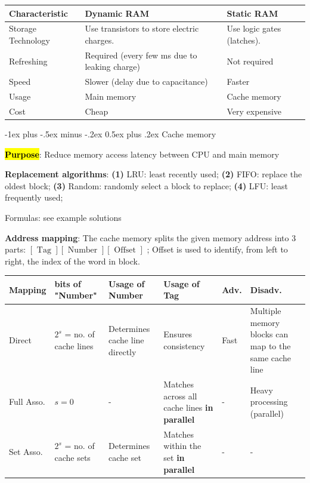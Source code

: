 \documentclass[a4paper]{article}
\makeatletter
\renewcommand{\section}{\@startsection{section}{1}{0mm}%
                                {-1ex plus -.5ex minus -.2ex}%
                                {0.5ex plus .2ex}%
                                {\normalfont\normalsize\bfseries}}
\makeatother
\begin{document}
\begin{multicols*}{2}
  \begin{tabular}{|l|l|l|}
    \hline
    \textbf{Characteristic} & \textbf{Dynamic RAM}                          & \textbf{Static RAM}        \\ \hline
    Storage Technology      & Use transistors to store electric charges.    & Use logic gates (latches). \\ \hline
    Refreshing              & Required (every few ms due to leaking charge) & Not required               \\ \hline
    Speed                   & Slower (delay due to capacitance)             & Faster                     \\ \hline
    Usage                   & Main memory                                   & Cache memory               \\ \hline
    Cost                    & Cheap                                         & Very expensive             \\ \hline
  \end{tabular}



  \section{Cache memory}

  \hl{\textbf{Purpose}}: Reduce memory access latency between CPU and main memory

  \textbf{Replacement algorithms}: \textbf{(1)} LRU: least recently used; \textbf{(2)} FIFO: replace the oldest block; \textbf{(3)} Random: randomly select a block to replace; \textbf{(4)} LFU: least frequently used;

  Formulas: see example solutions

  \textbf{Address mapping}: The cache memory splits the given memory address into 3 parts: $[\text{   Tag    }][\text{   Number    }][\text{   Offset    }]$
  ; Offset is used to identify, from left to right, the index of the word in block.

  \begin{tabular}{|p{1cm}|p{1cm}|p{2cm}|p{2cm}|p{1cm}|p{2cm}|}
    \hline
    \textbf{Mapping} & \textbf{bits of "Number"}  & \textbf{Usage of Number}       & \textbf{Usage of Tag}                               & \textbf{Adv.} & \textbf{Disadv.}                                      \\ \hline
    Direct           & $2^s$ = no. of cache lines & Determines cache line directly & Ensures consistency                                 & Fast          & Multiple memory blocks can map to the same cache line \\ \hline
    Full Asso.       & $s = 0$                    & -                              & Matches across all cache lines \textbf{in parallel} & -             & Heavy processing (parallel)                           \\ \hline
    Set Asso.        & $2^s$ = no. of cache sets  & Determines cache set           & Matches within the set \textbf{in parallel}         & -             & -                                                     \\ \hline
  \end{tabular}


\end{multicols*}
\end{document}
